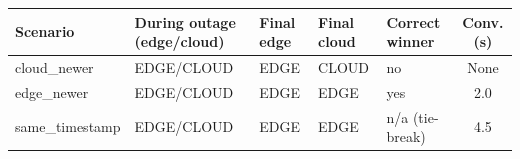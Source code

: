 \begin{tabular}{lllllc}
\toprule
Scenario & During outage (edge/cloud) & Final edge & Final cloud & Correct winner & Conv. (s)\\
\midrule
cloud\_newer & EDGE/CLOUD & EDGE & CLOUD & no & None\\
edge\_newer & EDGE/CLOUD & EDGE & EDGE & yes & 2.0\\
same\_timestamp & EDGE/CLOUD & EDGE & EDGE & n/a (tie-break) & 4.5\\
\bottomrule
\end{tabular}